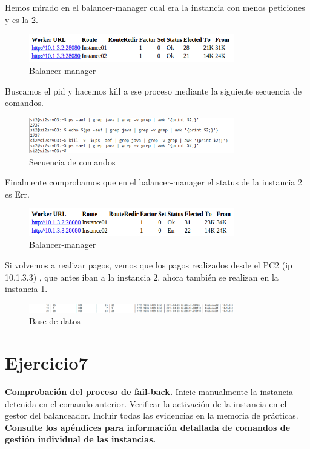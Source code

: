 \documentclass[a4paper, 10pt]{article}
\begin{document}
Hemos mirado en el balancer-manager cual era la instancia con menos peticiones y es la 2.

\begin{figure}[hbtp]
	\centering
	\includegraphics[width=0.8\textwidth]{../../P3/pantallazos/ej6-balancer1.png}
	\caption { Balancer-manager }
\end{figure}

Buscamos el pid y hacemos kill a ese proceso mediante la siguiente secuencia de comandos.

\begin{figure}[hbtp]
	\centering
	\includegraphics[width=0.8\textwidth]{../../P3/pantallazos/ej6-comandos.png}
	\caption { Secuencia de comandos }
\end{figure}

Finalmente comprobamos que en el balancer-manager el status de la instancia 2 es Err.

\begin{figure}[hbtp]
	\centering
	\includegraphics[width=0.8\textwidth]{../../P3/pantallazos/ej6-balancer2.png}
	\caption { Balancer-manager }
\end{figure}

Si volvemos a realizar pagos, vemos que los pagos realizados desde el PC2 (ip 10.1.3.3) , que antes iban a la instancia 2, ahora también se realizan en la instancia 1.

\begin{figure}[hbtp]
	\centering
	\includegraphics[width=0.8\textwidth]{../../P3/pantallazos/ej6-bd.png}
	\caption { Base de datos }
\end{figure}

\newpage
\section{Ejercicio7}
\begin{mdframed}
	 \textbf{Comprobación del proceso de fail-back.} Inicie manualmente la instancia detenida en el
	 comando anterior. Verificar la activación de la instancia en el gestor del balanceador. Incluir todas las
	 evidencias en la memoria de prácticas. \textbf{Consulte los apéndices para información detallada de
	 comandos de gestión individual de las instancias.}
\end{mdframed}
\end{document}
